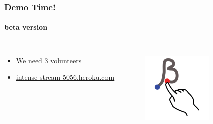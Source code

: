 \documentclass{beamer}
\begin{document}
\begin{frame}
\frametitle{Demo Time!}
\framesubtitle{beta version}


\begin{columns}
\begin{itemize}
	\item We need 3 volunteers 
	\item \url{intense-stream-5056.heroku.com}
	
\end{itemize}
\begin{figure}%
    \centering
    \href{intense-stream-5056.heroku.com}{\includegraphics[scale=0.5]{./images/beta.png}}
\end{figure}		
\end{columns}

\end{frame}
\end{document}

